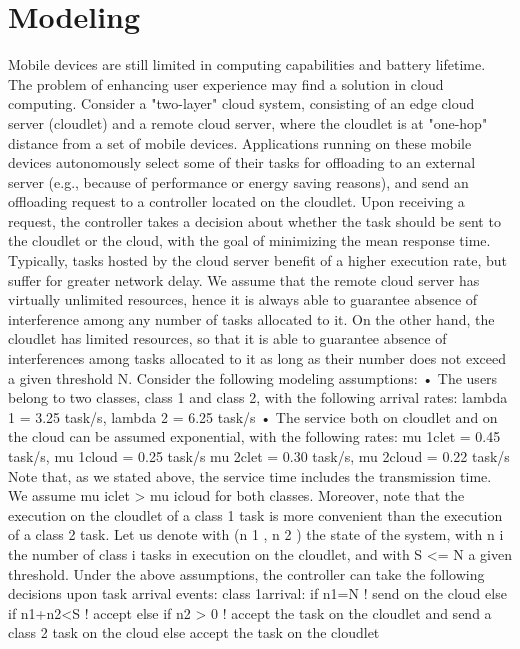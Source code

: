 \section{Modeling}
\label{sec:modeling}


Mobile devices are still limited in computing capabilities and battery lifetime. The problem of enhancing user
experience may find a solution in cloud computing.
Consider a "two-layer" cloud system, consisting of an edge cloud server (cloudlet) and a remote cloud server, where
the cloudlet is at "one-hop" distance from a set of mobile devices. Applications running on these mobile devices
autonomously select some of their tasks for offloading to an external server (e.g., because of performance or energy
saving reasons), and send an offloading request to a controller located on the cloudlet. Upon receiving a request, the
controller takes a decision about whether the task should be sent to the cloudlet or the cloud, with the goal of
minimizing the mean response time.
Typically, tasks hosted by the cloud server benefit of a higher execution rate, but suffer for greater network delay.
We assume that the remote cloud server has virtually unlimited resources, hence it is always able to guarantee
absence of interference among any number of tasks allocated to it. On the other hand, the cloudlet has limited
resources, so that it is able to guarantee absence of interferences among tasks allocated to it as long as their number
does not exceed a given threshold N.
%
Consider the following modeling assumptions:
• The users belong to two classes, class 1 and class 2, with the following arrival rates:
lambda 1 = 3.25 task/s, lambda 2 = 6.25 task/s
• The service both on cloudlet and on the cloud can be assumed exponential, with the following rates:
mu 1clet = 0.45 task/s, mu 1cloud = 0.25 task/s
mu 2clet = 0.30 task/s, mu 2cloud = 0.22 task/s
Note that, as we stated above, the service time includes the transmission time. We assume mu iclet > mu icloud for both
classes. Moreover, note that the execution on the cloudlet of a class 1 task is more convenient than the execution of a
class 2 task.
Let us denote with (n 1 , n 2 ) the state of the system, with n i the number of class i tasks in execution on the cloudlet, and
with S <= N a given threshold. Under the above assumptions, the controller can take the following decisions upon task
arrival events:
%
class 1arrival:
if n1=N ! send on the cloud
else if n1+n2<S ! accept
else if n2 > 0 ! accept the task on the cloudlet and send a class 2 task on the cloud
else accept the task on the cloudlet
